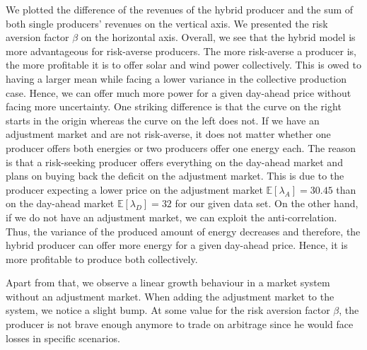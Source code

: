 We plotted the difference of the revenues of the hybrid producer and the sum of both single producers' revenues on the vertical axis. We presented the risk aversion factor $\beta$ on the horizontal axis. Overall, we see that the hybrid model is more advantageous for risk-averse producers. The more risk-averse a producer is, the more profitable it is to offer solar and wind power collectively. This is owed to having a larger mean while facing a lower variance in the collective production case. Hence, we can offer much more power for a given day-ahead price without facing more uncertainty. One striking difference is that the curve on the right starts in the origin whereas the curve on the left does not. If we have an adjustment market and are not risk-averse, it does not matter whether one producer offers both energies or two producers offer one energy each. The reason is that a risk-seeking producer offers everything on the day-ahead market and plans on buying back the deficit on the adjustment market. This is due to the producer expecting a lower price on the adjustment market $\mathbb{E}[\lambda_A]=30.45$ than on the day-ahead market $\mathbb{E}[\lambda_D]=32$ for our given data set.
On the other hand, if we do not have an adjustment market, we can exploit the anti-correlation. Thus, the variance of the produced amount of energy decreases and therefore, the hybrid producer can offer more energy for a given day-ahead price. Hence, it is more profitable to produce both collectively. 

Apart from that, we observe a linear growth behaviour in a market system without an adjustment market. When adding the adjustment market to the system, we notice a slight bump. At some value for the risk aversion factor $\beta$, the producer is not brave enough anymore to trade on arbitrage since he would face losses in specific scenarios. 

